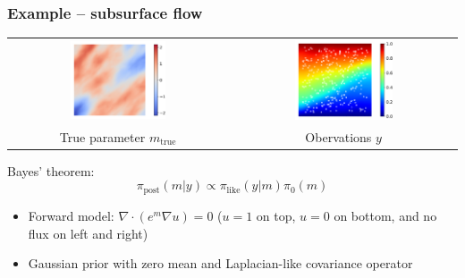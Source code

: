 \documentclass{beamer}
\begin{document}
\begin{frame}[c]
  \frametitle{Example -- subsurface flow}

  \begin{tabular}{cc}
    \includegraphics[width=0.45\textwidth]{./figures/ex1_true_parameter.png}
    &
    \includegraphics[width=0.45\textwidth]{./figures/ex1_true_state_observation.png}
    \\
    True parameter $m_{\text{true}}$
    &
    Obervations $y$
  \end{tabular}

  \vspace{0.3cm}

  Bayes' theorem:
  \[
    \pi_{\text{post}} (m|y) \propto \pi_{\text{like}} (y|m)
    \pi_{0} (m)
  \]

  \begin{itemize}
    \item Forward model: $\nabla \cdot (e^m \nabla u) = 0$ ($u=1$ on top,
      $u=0$ on bottom, and no flux on left and right)
    \item Gaussian prior with zero mean and Laplacian-like covariance operator
  \end{itemize}
\end{frame}
\end{document}
